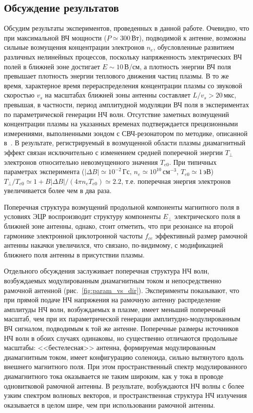 \documentclass[10pt]{disser}
\begin{document}
\subsection{Обсуждение результатов}
Обсудим результаты экспериментов, проведенных в данной работе. Очевидно, что при максимальной ВЧ мощности ($P\simeq300$\,Вт), подводимой к антенне, возможны сильные возмущения концентрации электронов $n_e$, обусловленные развитием различных нелинейных процессов, поскольку напряженность электрических ВЧ полей в ближней зоне достигает $E\sim 10$\,В/см, а плотность энергии ВЧ поля превышает плотность энергии теплового движения частиц плазмы. В то же время, характерное время перераспределения концентрации плазмы со звуковой скоростью $v_s$ на масштабах ближней зоны антенны составляет $L/v_s >20$\,мкс, превышая, в частности, период амплитудной модуляции ВЧ поля в экспериментах по параметрической генерации НЧ волн. Отсутствие заметных возмущений концентрации плазмы на указанных временах подтверждается прецизионными измерениями, выполненными зондом с СВЧ-резонатором по методике, описанной в~\cite{Yanin}. В результате, регистрируемый в возмущенной области плазмы диамагнитный эффект связан исключительно с изменением средней поперечной энергии $T_{\perp}$ электронов относительно невозмущенного значения $T_{e0}$. При типичных параметрах эксперимента ($|\Delta B|\simeq 10^{-2}$\,Гс, $n_e\simeq 10^{10}$\,см$^{-3}$, $T_{e0}\simeq 1$\,эВ) $T_{\perp}/T_{e0} \simeq 1 + B|\Delta B|/(4\pi n_{e}T_{e0}) \simeq 2.2$, т.е. поперечная энергия электронов увеличивается более чем в два раза.

Поперечная структура возмущений продольной компоненты магнитного поля в условиях ЭЦР воспроизводит структуру компоненты $E_{\perp}$ электрического поля в ближней зоне антенны, однако, стоит отметить, что при резонансе на второй гармонике электронной циклотронной частоты $f_{ce}$ эффективный размер рамочной антенны накачки увеличился, что связано, по-видимому, с модификацией ближнего поля антенны в присутствии плазмы.

Отдельного обсуждения заслуживает поперечная структура НЧ волн, возбуждаемых модулированным диамагнитным током и непосредственно рамочной антенной (\mbox{рис.~\ref{fig:param_vs_dir}}). Эксперименты показывают, что при прямой подаче НЧ напряжения на рамочную антенну распределение амплитуды НЧ волн, возбуждаемых в плазме, имеет меньший поперечный масштаб, чем при их параметрической генерации амплитудно-модулированным ВЧ сигналом, подводимым к той же антенне. Поперечные размеры источников НЧ волн в обоих случаях одинаковы, но существенно отличаются продольные масштабы: <<бестелесная>> антенна, формируемая модулированным диамагнитным током, имеет конфигурацию соленоида, сильно вытянутого вдоль внешнего магнитного поля. При этом пространственный спектр модулированного диамагнитного тока оказывается не таким широким, как у тока в проводе одновитковой рамочной антенны. В результате, возбуждаются НЧ волны с более узким спектром волновых векторов, и пространственная структура НЧ излучения оказывается в целом шире, чем при использовании рамочной антенны.
\end{document}
